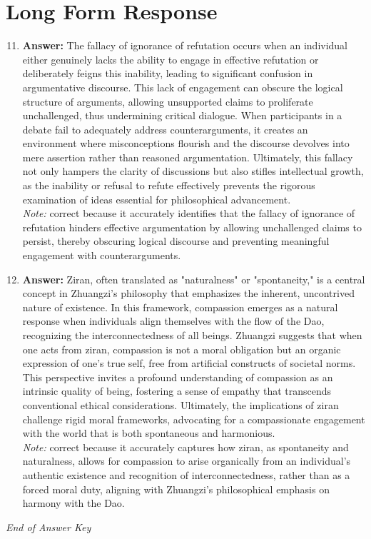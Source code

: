 \documentclass[12pt]{article}
\begin{document}
\section*{Long Form Response}
\begin{enumerate}[label=\arabic*.]
\setcounter{enumi}{10}
\item \textbf{Answer:} The fallacy of ignorance of refutation occurs when an individual either genuinely lacks the ability to engage in effective refutation or deliberately feigns this inability, leading to significant confusion in argumentative discourse. This lack of engagement can obscure the logical structure of arguments, allowing unsupported claims to proliferate unchallenged, thus undermining critical dialogue. When participants in a debate fail to adequately address counterarguments, it creates an environment where misconceptions flourish and the discourse devolves into mere assertion rather than reasoned argumentation. Ultimately, this fallacy not only hampers the clarity of discussions but also stifles intellectual growth, as the inability or refusal to refute effectively prevents the rigorous examination of ideas essential for philosophical advancement.
\\ \textit{Note:} correct because it accurately identifies that the fallacy of ignorance of refutation hinders effective argumentation by allowing unchallenged claims to persist, thereby obscuring logical discourse and preventing meaningful engagement with counterarguments.
\item \textbf{Answer:} Ziran, often translated as "naturalness" or "spontaneity," is a central concept in Zhuangzi's philosophy that emphasizes the inherent, uncontrived nature of existence. In this framework, compassion emerges as a natural response when individuals align themselves with the flow of the Dao, recognizing the interconnectedness of all beings. Zhuangzi suggests that when one acts from ziran, compassion is not a moral obligation but an organic expression of one's true self, free from artificial constructs of societal norms. This perspective invites a profound understanding of compassion as an intrinsic quality of being, fostering a sense of empathy that transcends conventional ethical considerations. Ultimately, the implications of ziran challenge rigid moral frameworks, advocating for a compassionate engagement with the world that is both spontaneous and harmonious.
\\ \textit{Note:} correct because it accurately captures how ziran, as spontaneity and naturalness, allows for compassion to arise organically from an individual's authentic existence and recognition of interconnectedness, rather than as a forced moral duty, aligning with Zhuangzi's philosophical emphasis on harmony with the Dao.
\end{enumerate}

\vfill
\noindent\textit{End of Answer Key}
\end{document}
